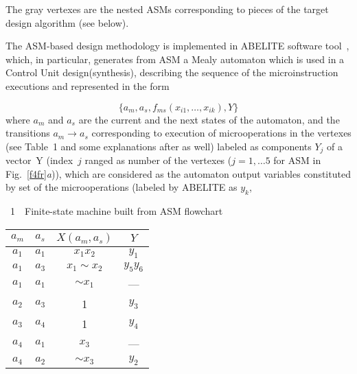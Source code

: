 \begin{multicols}{2}
       
       The gray vertexes are the nested ASMs corresponding to pieces of the target design 
algorithm (see below).  
       
The ASM-based design methodology is implemented in ABELITE software tool~\cite{5fr}, 
which, in particular, generates from ASM a Mealy automaton which is used in a Control Unit 
design(synthesis), describing the sequence of the microinstruction executions and represented in 
the form

\vspace*{2pt}

\noindent
\begin{equation}
\{a_m, a_s , f_{ms}(x_{i1}, \ldots , x_{ik}),Y\}
\label{e2fr}
\end{equation}
where $a_m$ and $a_s$ are the current and the next states of the automaton, and the transitions 
$a_m\rightarrow a_s$ corresponding to execution of microoperations in the vertexes (see Table~1 
and some explanations after as well) labeled as components $Y_j$ of a vector~Y (index~$j$ 
ranged as number of the vertexes ($j=1, \ldots 5$ for ASM in Fig.~\ref{f4fr}\textit{a})), which 
are considered as the automaton output variables constituted by set of the microoperations 
(labeled by ABELITE as $y_k$,\linebreak\vspace*{-12pt}

\begin{center}
\vspace*{2pt}
\parbox{50mm}{{\tablename~1}\ \ \small{Finite-state machine built from  ASM flowchart}}
\end{center}
\vspace*{2pt}

{\small \begin{center}
\tabcolsep=8pt
\begin{tabular}{cccc}
\hline
$ a_m$&$a_s$&$X(a_m,a_s)$&$Y$\\
\hline
$a_1$&$a_1$&$x_1x_2$&$y_1$\\
$a_1$&$a_3$&$x_1\sim x_2$&$y_5y_6$\\
$a_1$&$a_1$&$\sim x_1$&---\\
$a_2$&$a_3$&1&$y_3$\\
$a_3$&$a_4$&1&$y_4$\\
$a_4$ &$a_1$&$x_3$&---\\
$a_4$&$a_2$&$\sim x_3$&$y_2$\\
\hline
\end{tabular}
\end{center}
}



\end{multicols}
